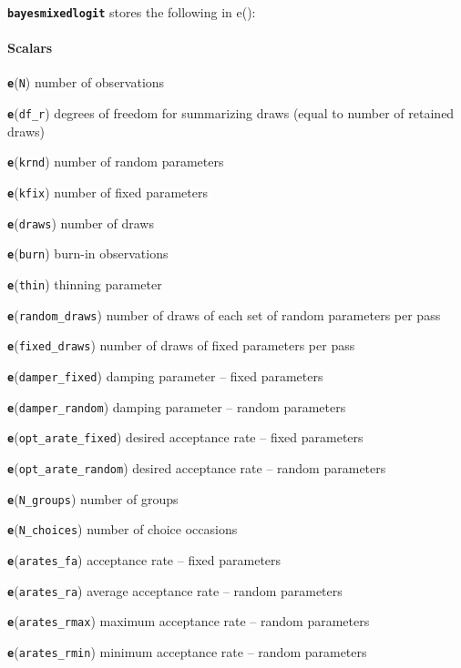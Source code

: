 \documentclass[11pt]{article}
\begin{document}
\textbf{\texttt{bayesmixedlogit}} stores the following in e():

\hypertarget{scalars}{%
\paragraph{Scalars}\label{scalars}}

\textbf{\texttt{e}}(\texttt{N}) number of observations

\textbf{\texttt{e}}(\texttt{df\_r}) degrees of freedom for summarizing
draws (equal to number of retained draws)

\textbf{\texttt{e}}(\texttt{krnd}) number of random parameters

\textbf{\texttt{e}}(\texttt{kfix}) number of fixed parameters

\textbf{\texttt{e}}(\texttt{draws}) number of draws

\textbf{\texttt{e}}(\texttt{burn}) burn-in observations

\textbf{\texttt{e}}(\texttt{thin}) thinning parameter

\textbf{\texttt{e}}(\texttt{random\_draws}) number of draws of each set
of random parameters per pass

\textbf{\texttt{e}}(\texttt{fixed\_draws}) number of draws of fixed
parameters per pass

\textbf{\texttt{e}}(\texttt{damper\_fixed}) damping parameter -- fixed
parameters

\textbf{\texttt{e}}(\texttt{damper\_random}) damping parameter -- random
parameters

\textbf{\texttt{e}}(\texttt{opt\_arate\_fixed}) desired acceptance rate
-- fixed parameters

\textbf{\texttt{e}}(\texttt{opt\_arate\_random}) desired acceptance rate
-- random parameters

\textbf{\texttt{e}}(\texttt{N\_groups}) number of groups

\textbf{\texttt{e}}(\texttt{N\_choices}) number of choice occasions

\textbf{\texttt{e}}(\texttt{arates\_fa}) acceptance rate -- fixed
parameters

\textbf{\texttt{e}}(\texttt{arates\_ra}) average acceptance rate --
random parameters

\textbf{\texttt{e}}(\texttt{arates\_rmax}) maximum acceptance rate --
random parameters

\textbf{\texttt{e}}(\texttt{arates\_rmin}) minimum acceptance rate --
random parameters
\end{document}
